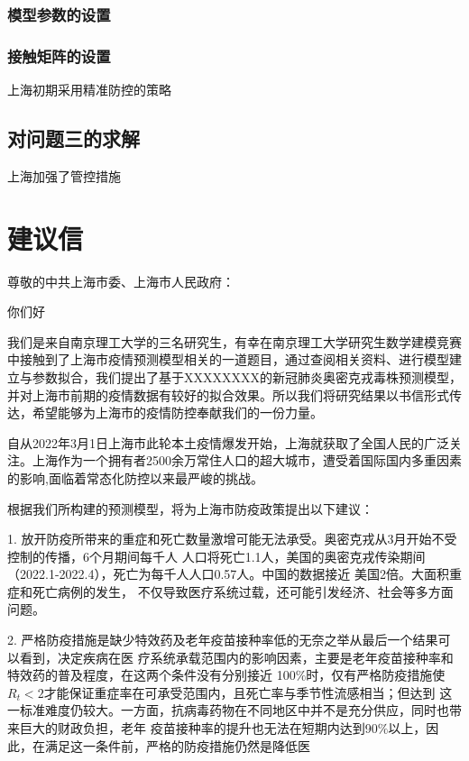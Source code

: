 \documentclass[bwprint]{gmcmthesis}
\numberwithin{figure}{section}
\begin{document}
\subsubsection{模型参数的设置}
\subsubsection{接触矩阵的设置}
上海初期采用精准防控的策略
\subsection{对问题三的求解}
上海加强了管控措施

\section{建议信}
\begin{flushleft}
    尊敬的中共上海市委、上海市人民政府：
\end{flushleft}
\par 你们好
\par 我们是来自南京理工大学的三名研究生，有幸在南京理工大学研究生数学建模竞赛中接触到了上海市疫情预测模型相关的一道题目，通过查阅相关资料、进行模型建立与参数拟合，我们提出了基于XXXXXXXX的新冠肺炎奥密克戎毒株预测模型，并对上海市前期的疫情数据有较好的拟合效果。所以我们将研究结果以书信形式传达，希望能够为上海市的疫情防控奉献我们的一份力量。
\par 自从2022年3月1日上海市此轮本土疫情爆发开始，上海就获取了全国人民的广泛关注。上海作为一个拥有者2500余万常住人口的超大城市，遭受着国际国内多重因素的影响,面临着常态化防控以来最严峻的挑战。
\par 根据我们所构建的预测模型，将为上海市防疫政策提出以下建议：
\par 1. 放开防疫所带来的重症和死亡数量激增可能无法承受。奥密克戎从3月开始不受控制的传播，6个月期间每千人
人口将死亡1.1人，美国的奥密克戎传染期间（2022.1-2022.4），死亡为每千人人口0.57人。中国的数据接近
美国2倍。大面积重症和死亡病例的发生， 不仅导致医疗系统过载，还可能引发经济、社会等多方面问题。
\par 2. 严格防疫措施是缺少特效药及老年疫苗接种率低的无奈之举从最后一个结果可以看到，决定疾病在医
疗系统承载范围内的影响因素，主要是老年疫苗接种率和特效药的普及程度，在这两个条件没有分别接近
100$\%$时，仅有严格防疫措施使$R_t<2$才能保证重症率在可承受范围内，且死亡率与季节性流感相当；但达到
这一标准难度仍较大。一方面，抗病毒药物在不同地区中并不是充分供应，同时也带来巨大的财政负担，老年
疫苗接种率的提升也无法在短期内达到90$\%$以上，因此，在满足这一条件前，严格的防疫措施仍然是降低医
\end{document}
